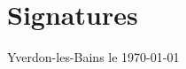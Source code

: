 \documentclass[a4paper,12pt,oneside]{article}
\begin{document}
	
	
	\thispagestyle{empty}
	\setcounter{page}{1}
	\newpage
	
	
	
	
	
	
	
	\section{Signatures}
  
    Yverdon-les-Bains le \today \\
    \begin{center}
      \nomAuteur
    \end{center}
  
	
\end{document}
